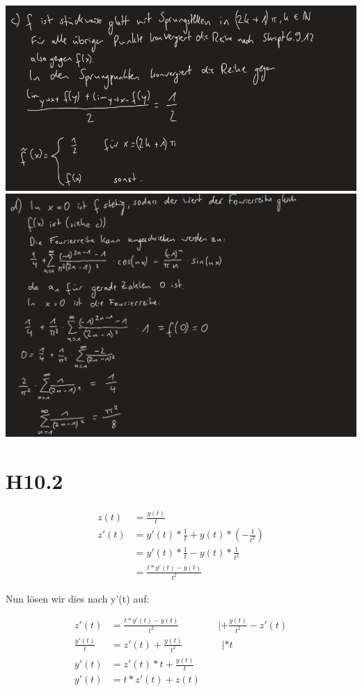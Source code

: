 \documentclass{article}
\newcommand{\tab}{\qquad \qquad}
\begin{document}
\includegraphics[scale=0.5]{ 7 } \\ 
\includegraphics[scale=0.5]{ 8 }

\section*{H10.2}
\begin{align*}
    z(t) &= \frac{y(t)}{t} \\ 
    z'(t) &= y'(t) * \frac{1}{t} + y(t) * (- \frac{1}{t^2}) \\ 
          &= y'(t) * \frac{1}{t} - y(t) * \frac{1}{t^2} \\
          &= \frac{t * y'(t) - y(t)}{t^2}
\end{align*}

Nun lösen wir dies nach y'(t) auf:

\begin{align*}
    z'(t) &= \frac{t * y'(t) - y(t)}{t^2} \tab |  +\frac{y(t)}{t^2} -z'(t) \\ 
    \frac{y'(t)}{t} &= z'(t) + \frac{y(t)}{t^2} \tab |  * t \\
    y'(t) &= z'(t) * t + \frac{y(t)}{t} \\ 
    y'(t) &= t * z'(t) + z(t)
\end{align*}
\end{document}
